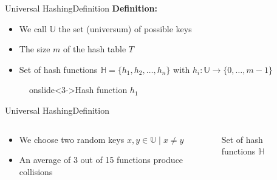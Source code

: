 \begin{frame}{Universal Hashing}{Definition}
  \textbf{Definition:}
  \begin{itemize}
    \item<1->
      We call {\color{Mittel-Blau}$\mathbb{U}$} the set (universum) of possible keys
    \item<2->
      The size {\color{Mittel-Blau}$m$} of the hash table {\color{Mittel-Blau}$T$}
    \item<3->
      Set of hash functions {\color{Mittel-Blau}$\mathbb{H} = \{h_1, h_2,\dots, h_n\}$} with
      {\color{Mittel-Blau}$h_i: \mathbb{U} \to \{0,\dots, m - 1\}$}
  \end{itemize}%
  \begin{figure}[!b]%
    \begin{adjustbox}{height=0.35\linewidth}%
    \end{adjustbox}
    \vspace*{-1.0em}%
    \caption{onslide<3->Hash function $h_1$}%
    \label{fig:universal_hashing:hash_function_definition}
  \end{figure}
\end{frame}


\begin{frame}{Universal Hashing}{Definition}
  \begin{columns}
    \begin{column}{0.5\linewidth}
      \begin{itemize}
        \item <1->
          We choose two random keys {\color{Mittel-Blau}$x, y \in \mathbb{U} \mid x \neq y$}
        \item <2->
          An average of 3 out of 15 functions produce collisions
      \end{itemize}
    \end{column}
    \begin{column}{0.5\linewidth}
      \begin{figure}[!t]%
        \begin{adjustbox}{width=\linewidth}
        \end{adjustbox}
        \caption{Set of hash functions $\mathbb{H}$}%
        \label{fig:universal_hashing:hash_universe}
      \end{figure}
    \end{column}
  \end{columns}
\end{frame}

